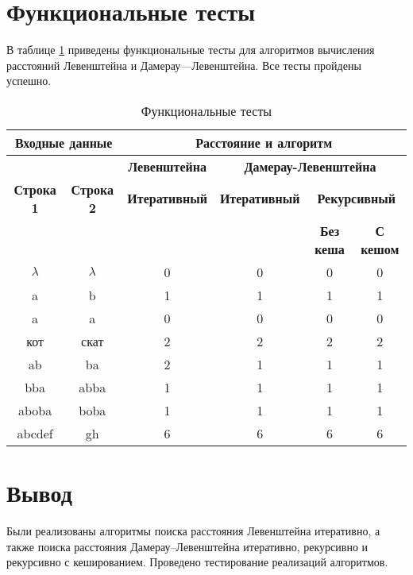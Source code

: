 \clearpage


\section{Функциональные тесты}

В таблице \ref{tbl:func_tests} приведены функциональные тесты для алгоритмов вычисления расстояний Левенштейна и Дамерау—Левенштейна. Все тесты пройдены успешно.

\begin{table}[ht]
	\small
	\begin{center}
		\begin{threeparttable}
		\caption{Функциональные тесты}
		\label{tbl:func_tests}
		\begin{tabular}{|c|c|c|c|c|c|}
			\hline
			\multicolumn{2}{|c|}{\bfseries Входные данные}
			& \multicolumn{4}{c|}{\bfseries Расстояние и алгоритм} \\ 
			\hline 
			&
			& \multicolumn{1}{c|}{\bfseries Левенштейна} 
			& \multicolumn{3}{c|}{\bfseries Дамерау-Левенштейна} \\ \cline{3-6}
			
			\bfseries Строка 1 & \bfseries Строка 2 & \bfseries Итеративный & \bfseries Итеративный
			
			& \multicolumn{2}{c|}{\bfseries Рекурсивный} \\ \cline{5-6}
			& & & & \bfseries Без кеша & \bfseries С кешом \\
			\hline
			$\lambda$ & $\lambda$ & 0 & 0 & 0 & 0 \\
			\hline
			a & b & 1 & 1 & 1 & 1 \\
			\hline
			a & a & 0 & 0 & 0 & 0 \\
			\hline
			кот & скат & 2 & 2 & 2 & 2 \\
			\hline
			ab & ba & 2 & 1 & 1 & 1 \\
			\hline
			bba & abba & 1 & 1 & 1 & 1 \\
			\hline
			aboba & boba & 1 & 1 & 1 & 1 \\
			\hline
			abcdef & gh & 6 & 6 & 6 & 6 \\
			\hline
			
		\end{tabular}	
		\end{threeparttable}
	\end{center}
\end{table}

\section*{Вывод}

Были реализованы алгоритмы поиска расстояния Левенштейна итеративно, а также поиска расстояния Дамерау–Левенштейна итеративно, рекурсивно и рекурсивно с кешированием. Проведено тестирование реализаций алгоритмов.
